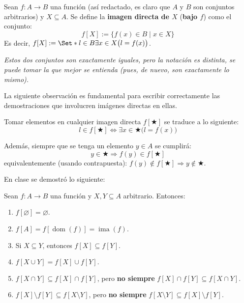 \documentclass[letterpaper,DIV=14,headsepline,12pt]{scrartcl}
\providecommand\tq{\;|\;}
\providecommand\given{}
\renewcommand{\emptyset}{\varnothing}
\DeclareMathOperator{\ima}{ima}
\DeclareMathOperator{\dom}{dom}
\begin{document}
    \begin{definicion}
        Sean $f:A \to B$ una función (así redactado, es claro que $A$ y $B$ son conjuntos arbitrarios) y $X \subseteq A$. Se define la \textbf{imagen directa de $X$} (\textbf{bajo $f$}) como el conjunto:
        \[ f[X]:=\{ f(x) \in B \tq x \in X \} \]
        Es decir, $ f[X]:=\Set*{ l \in B \given \exists x \in X \big( l=f(x) \big)} $.

        \textit{Estos dos conjuntos son exactamente iguales, pero la notación es distinta, se puede tomar la que mejor se entienda (pues, de nuevo, son exactamente lo mismo).}
    \end{definicion}

    La siguiente observación es fundamental para escribir correctamente las demostraciones que involucren imágenes directas en ellas.

    \begin{observacion}
        Tomar elementos en cualquier imagen directa $f[\bigstar]$ se traduce a lo siguiente:
        \[ l \in f[\bigstar] \iff \exists x \in \bigstar \big( l=f(x) \big) \]

        Además, siempre que se tenga un elemento $y \in A$ se cumplirá:
        \[ y \in \bigstar \Rightarrow f(y) \in f[\bigstar] \]
        equivalentemente (usando contrapuesta): $f(y) \notin f[\bigstar] \Rightarrow y \notin \bigstar$.
    \end{observacion}

    En clase se demostró lo siguiente:
    \begin{teorema}
        Sean $f:A \to B$ una función y $X, Y \subseteq A$ arbitrario. Entonces:
        \begin{enumerate}
            \item $f[\emptyset]=\emptyset$.
            \item $f[A]=f[\dom(f)]=\ima(f)$.
            \item Si $X \subseteq Y$, entonces $f[X] \subseteq f[Y]$.
            \item $f[X \cup Y] = f[X] \cup f[Y]$.
            \item $f[X \cap Y] \subseteq f[X] \cap f[Y]$, pero \textbf{no siempre} $f[X] \cap f[Y] \subseteq f[X \cap Y]$.
            \item $f[X] \setminus f[Y] \subseteq f[X \setminus Y]$, pero \textbf{no siempre} $f[X \setminus Y] \subseteq f[X] \setminus f[Y]$.
        \end{enumerate}
    \end{teorema}
\end{document}
